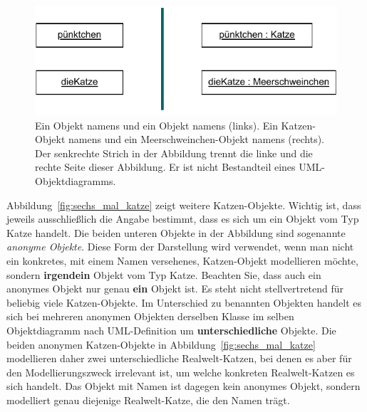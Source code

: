 \begin{figure}[h!]
	\centering
	\includegraphics{Bilder/Kapitel-4/darstellung_objekt.pdf}
	\caption[Ein Katzen-Objekt namens  und ein Meerschweinchen-Objekt namens ]{Ein Objekt namens  und ein Objekt namens  (links). Ein Katzen-Objekt namens  und ein Meerschweinchen-Objekt namens  (rechts). Der senkrechte Strich in der Abbildung trennt die linke und die rechte Seite dieser Abbildung. Er ist nicht Bestandteil eines UML-Objektdiagramms.}
	\label{fig:darstellung_objekt}
\end{figure}



Abbildung~\ref{fig:sechs_mal_katze} zeigt weitere Katzen-Objekte. Wichtig ist, dass jeweils ausschließlich die Angabe  bestimmt, dass es sich um ein Objekt vom Typ Katze handelt. Die beiden unteren Objekte in der Abbildung sind sogenannte \textit{anonyme Objekte}.
Diese Form der Darstellung wird verwendet, wenn man nicht ein konkretes, mit einem Namen versehenes, Katzen-Objekt modellieren möchte, sondern \textbf{irgendein} Objekt vom Typ Katze. Beachten Sie, dass auch ein anonymes Objekt nur genau \textbf{ein} Objekt ist. Es steht nicht stellvertretend für beliebig viele Katzen-Objekte. Im Unterschied zu benannten Objekten handelt es sich bei mehreren anonymen Objekten derselben Klasse im selben Objektdiagramm nach UML-Definition um \textbf{unterschiedliche} Objekte. Die beiden anonymen Katzen-Objekte in Abbildung~\ref{fig:sechs_mal_katze} modellieren daher zwei unterschiedliche Realwelt-Katzen, bei denen es aber für den Modellierungszweck irrelevant ist, um welche konkreten Realwelt-Katzen es sich handelt. Das Objekt mit Namen  ist dagegen kein anonymes Objekt, sondern modelliert genau diejenige Realwelt-Katze, die den Namen  trägt.

